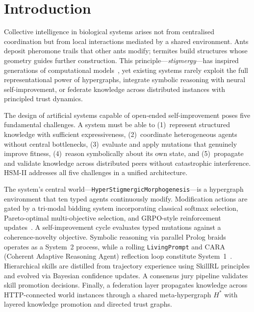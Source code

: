 \documentclass[11pt]{article}
\begin{document}
\tableofcontents
\newpage

\section{Introduction}\nopagebreak[4]
\label{sec:intro}

Collective intelligence in biological systems arises not from centralised
coordination but from local interactions mediated by a shared environment.
Ants deposit pheromone trails that other ants modify; termites build structures
whose geometry guides further construction. This principle---\emph{stigmergy}---has
inspired generations of computational models~\cite{grasse1959,dorigo1996}, yet
existing systems rarely exploit the full representational power of hypergraphs,
integrate symbolic reasoning with neural self-improvement, or federate knowledge
across distributed instances with principled trust dynamics.

The design of artificial systems capable of open-ended self-improvement poses five
fundamental challenges. A system must be able to (1)~represent structured knowledge
with sufficient expressiveness, (2)~coordinate heterogeneous agents without central
bottlenecks, (3)~evaluate and apply mutations that genuinely improve fitness,
(4)~reason symbolically about its own state, and (5)~propagate and validate
knowledge across distributed peers without catastrophic interference. HSM-II
addresses all five challenges in a unified architecture.

The system's central world---\texttt{HyperStigmergicMorphogenesis}---is a
hypergraph environment that ten typed agents continuously modify. Modification
actions are gated by a tri-modal bidding system incorporating classical softmax
selection, Pareto-optimal multi-objective selection, and GRPO-style reinforcement
updates~\cite{shao2024grpo}. A self-improvement cycle evaluates typed mutations
against a coherence-novelty objective. Symbolic reasoning via parallel Prolog
braids operates as a System~2 process, while a rolling \texttt{LivingPrompt} and
CARA (Coherent Adaptive Reasoning Agent) reflection loop constitute System~1~\cite{latimer2025hindsight}. Hierarchical
skills are distilled from trajectory experience using SkillRL principles and evolved
via Bayesian confidence updates. A consensus jury pipeline validates skill promotion
decisions. Finally, a federation layer propagates knowledge across HTTP-connected
world instances through a shared meta-hypergraph $H^*$ with layered knowledge
promotion and directed trust graphs.
\end{document}
